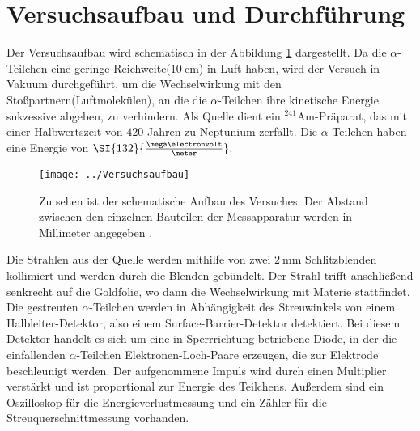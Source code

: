 \section{Versuchsaufbau und Durchführung}
\label{sec:Durchführung}
Der Versuchsaufbau wird schematisch in der Abbildung \ref{fig:versuchsaufbau} dargestellt. Da die $\alpha$-Teilchen eine geringe Reichweite($\SI{10}{\centi\meter}$) in Luft haben, wird der Versuch in Vakuum durchgeführt, um die Wechselwirkung mit den Stoßpartnern(Luftmolekülen), an die die $\alpha$-Teilchen ihre kinetische Energie sukzessive abgeben, zu verhindern. Als Quelle dient ein $^{241}$Am-Präparat, das mit einer Halbwertszeit von $420$ Jahren zu Neptunium zerfällt. Die $\alpha$-Teilchen haben eine Energie von $\SI{132}{\frac{\mega\electronvolt}{\meter}}$.
\begin{figure}[h!]
	\centering
	\texttt{[image: ../Versuchsaufbau]}
	\caption{Zu sehen ist der schematische Aufbau des Versuches. Der Abstand zwischen den einzelnen Bauteilen der Messapparatur werden in Millimeter angegeben \cite[2]{anleitungV16}.}
	\label{fig:versuchsaufbau}
\end{figure}
Die Strahlen aus der Quelle werden mithilfe von zwei $\SI{2}{\milli\meter}$ Schlitzblenden kollimiert und werden durch die Blenden gebündelt. Der Strahl trifft anschließend senkrecht auf die Goldfolie, wo dann die Wechselwirkung mit Materie stattfindet. Die gestreuten $\alpha$-Teilchen werden in Abhängigkeit des Streuwinkels von einem Halbleiter-Detektor, also einem Surface-Barrier-Detektor detektiert. Bei diesem Detektor handelt es sich um eine in Sperrrichtung betriebene Diode, in der die einfallenden $\alpha$-Teilchen Elektronen-Loch-Paare erzeugen, die zur Elektrode beschleunigt werden. Der aufgenommene Impuls wird durch einen Multiplier verstärkt und ist proportional zur Energie des Teilchens. Außerdem sind ein Oszilloskop für die Energieverlustmessung und ein Zähler für die Streuquerschnittmessung vorhanden.

